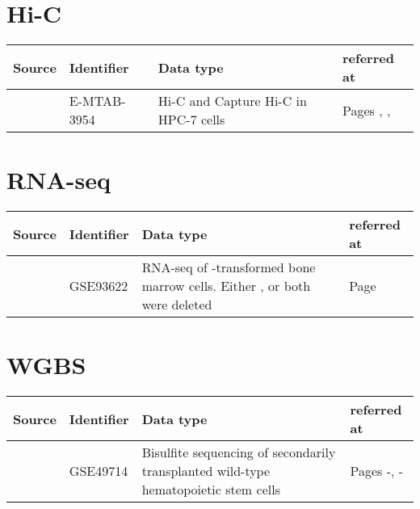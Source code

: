 \section*{Hi-C}
	\label{chap:ap:thirdpartydata:hic}

\begin{tabular}{ll>{\raggedright}p{7.3cm}p{2cm}}
	\textbf{Source} & \textbf{Identifier} & \textbf{Data type} & \textbf{referred at} \\
	\hline
	\cite{Wilson2016} & E-MTAB-3954 & Hi-C and Capture Hi-C in HPC-7 cells & \raggedright Pages \pageref{chap:r:gam:chromatin:hic},	 \pageref{fig:tinatdensplot_LSChicpc1overall.pdf}, \pageref{chap:r:enhancers:targets:assignment} \\
\end{tabular}

\section*{RNA-seq}
 	\label{chap:ap:thirdpartydata:rna}
	\begin{tabular}{llp{7.5cm}p{3.0cm}}
	\textbf{Source} & \textbf{Identifier} & \textbf{Data type} & \textbf{referred at} \\
	\hline
	\cite{Chen2017a}  &  GSE93622 & RNA-seq of  \mllafnine-transformed \kitpos bone marrow cells. Either \proteinnamemouse{Mll1}, \proteinnamemouse{Mll2} or both were deleted & \raggedright Page  \pageref{chap:r:enhancers:targets:mlltwotargets} \\
 \end{tabular}	

\section*{WGBS}
	\label{chap:ap:thirdpartydata:wgbs}

\begin{tabular}{llp{7.5cm}p{3.0cm}}
	\textbf{Source} & \textbf{Identifier} & \textbf{Data type} & \textbf{referred at} \\
	\hline
	\cite{Jeong2014} & GSE49714 & Bisulfite sequencing of secondarily transplanted wild-type hematopoietic stem cells & \raggedright  Pages \pageref{chap:r:wgbs:demethylation}-\pageref{fig:wgbs_gam_points_chr18.pdf}, \pageref{chap:r:enhancers:motifs:methylation:motifs}-\pageref{chap:r:enhancers:motifs:mlltwo} \\
\end{tabular}	





